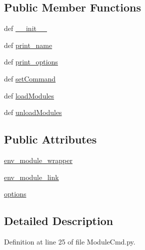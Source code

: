 \subsection*{Public Member Functions}
\begin{DoxyCompactItemize}
\item 
def \hyperlink{class_module_cmd_1_1_module_cmd_afc2639b024f0254c9a1e4db7c0e890cf}{\-\_\-\-\_\-init\-\_\-\-\_\-}
\item 
def \hyperlink{class_module_cmd_1_1_module_cmd_ae44917ee5bdcc85a4b1675f82a2f03b3}{print\-\_\-name}
\item 
def \hyperlink{class_module_cmd_1_1_module_cmd_a731bb50ac44c88e49675b9790740a9af}{print\-\_\-options}
\item 
def \hyperlink{class_module_cmd_1_1_module_cmd_aafcfb3f7b8d445df29c888c938c932fd}{set\-Command}
\item 
def \hyperlink{class_module_cmd_1_1_module_cmd_acb50720c70196a40e3bde85f79fea3cb}{load\-Modules}
\item 
def \hyperlink{class_module_cmd_1_1_module_cmd_a93a6a59db499c50ffb9ffe8e043a4733}{unload\-Modules}
\end{DoxyCompactItemize}
\subsection*{Public Attributes}
\begin{DoxyCompactItemize}
\item 
\hyperlink{class_module_cmd_1_1_module_cmd_ae60edec82191b5a7a1830495b1ca2e3e}{env\-\_\-module\-\_\-wrapper}
\item 
\hyperlink{class_module_cmd_1_1_module_cmd_a1b4a34e278600fe59cd55bb0d56baa61}{env\-\_\-module\-\_\-link}
\item 
\hyperlink{class_module_cmd_1_1_module_cmd_a981a0fc879a722b76faa16b4289ab953}{options}
\end{DoxyCompactItemize}


\subsection{Detailed Description}


Definition at line 25 of file Module\-Cmd.\-py.



